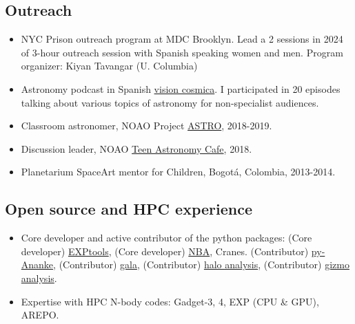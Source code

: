 \documentclass[14pt]{article}
\begin{document}
\subsection*{Outreach}
\begin{itemize}
  \setlength\itemsep{0.0em}
  \renewcommand\labelitemi{$\cdot$}
\item NYC Prison outreach program at MDC Brooklyn. Lead a 2 sessions in 2024 of 3-hour outreach
  session with Spanish speaking women and men. Program organizer: Kiyan Tavangar (U. Columbia) 
\item Astronomy podcast in Spanish \href{https://cosmoquest.org/x/visioncosmica/nuestro-equipo/}{vision
  cosmica}. I participated in 20 episodes talking about various topics of
  astronomy for non-specialist audiences. 
\item Classroom astronomer, NOAO Project \href{https://www.noao.edu/education/astro/}{ASTRO}, 2018-2019.
\item Discussion leader, NOAO \href{http://www.teenastronomycafe.org/}{Teen Astronomy Cafe}, 2018.
\item Planetarium SpaceArt mentor for Children, Bogot\'a, Colombia, 2013-2014.
\end{itemize}



\subsection*{Open source and HPC experience}

\begin{itemize}
  \setlength\itemsep{0.0em}
  \renewcommand\labelitemi{$\cdot$}
  \item Core developer and active contributor of the python packages:
    (Core developer) \href{https://github.com/EXP-code/EXP_tools}{EXPtools}, 
    (Core developer) \href{https://github.com/jngaravitoc/nba}{NBA}, Cranes. 
    (Contributor) \href{https://github.com/athob/py-ananke}{py-Ananke},
    (Contributor) \href{https://gala.adrian.pw/en/latest/}{gala},
    (Contributor) \href{https://bitbucket.org/awetzel/halo_analysis/src/master/}{halo analysis},
    (Contributor) \href{https://bitbucket.org/awetzel/gizmo_analysis/src/master/}{gizmo analysis}.
  \item Expertise with HPC N-body codes: Gadget-3, 4, EXP (CPU \& GPU), AREPO.  

\end{itemize}
\end{document}
